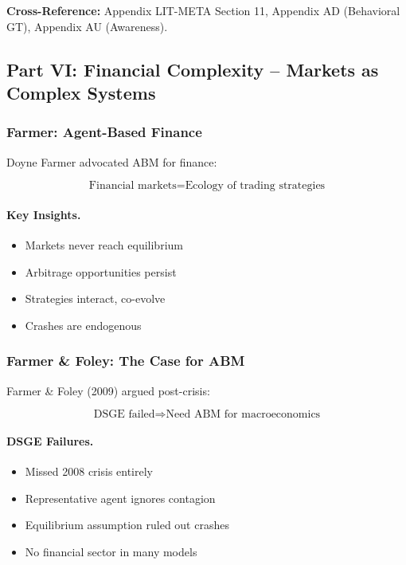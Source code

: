 \textbf{Cross-Reference:} Appendix LIT-META Section 11, Appendix AD (Behavioral GT),
Appendix AU (Awareness).

\subsection{Part VI: Financial Complexity – Markets as Complex Systems}

\subsubsection{Farmer: Agent-Based Finance}

Doyne Farmer advocated ABM for finance:

\begin{equation}
\boxed{
\text{Financial markets} = \text{Ecology of trading strategies}
}
\label{eq:farmer}
\end{equation}

\paragraph{Key Insights.}
\begin{itemize}
    \item Markets never reach equilibrium
    \item Arbitrage opportunities persist
    \item Strategies interact, co-evolve
    \item Crashes are endogenous
\end{itemize}

\subsubsection{Farmer \& Foley: The Case for ABM}

Farmer \& Foley (2009) argued post-crisis:

\begin{equation}
\text{DSGE failed} \Rightarrow \text{Need ABM for macroeconomics}
\end{equation}

\paragraph{DSGE Failures.}
\begin{itemize}
    \item Missed 2008 crisis entirely
    \item Representative agent ignores contagion
    \item Equilibrium assumption ruled out crashes
    \item No financial sector in many models
\end{itemize}

